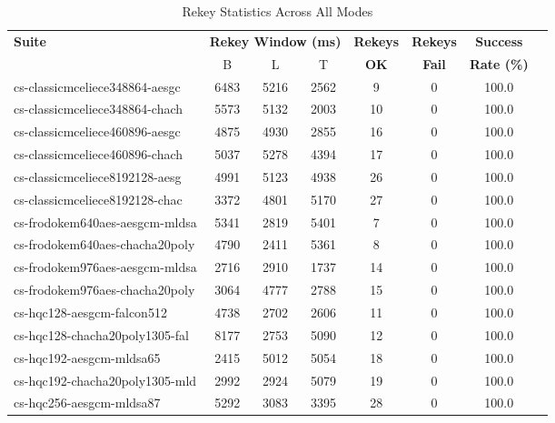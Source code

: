 \begin{table}[htbp]
\centering
\caption{Rekey Statistics Across All Modes}
\label{tab:rekey_stats}
\small
\begin{tabular}{@{}lccccccc@{}}
\toprule
\textbf{Suite} & \multicolumn{3}{c}{\textbf{Rekey Window (ms)}} & \textbf{Rekeys} & \textbf{Rekeys} & \textbf{Success} \\
 & B & L & T & \textbf{OK} & \textbf{Fail} & \textbf{Rate (\%)} \\
\midrule
cs-classicmceliece348864-aesgc & 6483 & 5216 & 2562 & 9 & 0 & 100.0 \\
cs-classicmceliece348864-chach & 5573 & 5132 & 2003 & 10 & 0 & 100.0 \\
cs-classicmceliece460896-aesgc & 4875 & 4930 & 2855 & 16 & 0 & 100.0 \\
cs-classicmceliece460896-chach & 5037 & 5278 & 4394 & 17 & 0 & 100.0 \\
cs-classicmceliece8192128-aesg & 4991 & 5123 & 4938 & 26 & 0 & 100.0 \\
cs-classicmceliece8192128-chac & 3372 & 4801 & 5170 & 27 & 0 & 100.0 \\
cs-frodokem640aes-aesgcm-mldsa & 5341 & 2819 & 5401 & 7 & 0 & 100.0 \\
cs-frodokem640aes-chacha20poly & 4790 & 2411 & 5361 & 8 & 0 & 100.0 \\
cs-frodokem976aes-aesgcm-mldsa & 2716 & 2910 & 1737 & 14 & 0 & 100.0 \\
cs-frodokem976aes-chacha20poly & 3064 & 4777 & 2788 & 15 & 0 & 100.0 \\
cs-hqc128-aesgcm-falcon512 & 4738 & 2702 & 2606 & 11 & 0 & 100.0 \\
cs-hqc128-chacha20poly1305-fal & 8177 & 2753 & 5090 & 12 & 0 & 100.0 \\
cs-hqc192-aesgcm-mldsa65 & 2415 & 5012 & 5054 & 18 & 0 & 100.0 \\
cs-hqc192-chacha20poly1305-mld & 2992 & 2924 & 5079 & 19 & 0 & 100.0 \\
cs-hqc256-aesgcm-mldsa87 & 5292 & 3083 & 3395 & 28 & 0 & 100.0 \\
\bottomrule
\end{tabular}
\end{table}
